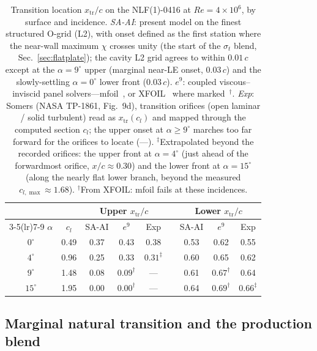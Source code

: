 \documentclass[journal]{new-aiaa}
\begin{document}
\begin{table}[tp]
  \centering
  \small
  \caption{Transition location $x_\mathrm{tr}/c$ on the NLF(1)-0416 at
  $Re\!=\!4\!\times\!10^6$, by surface and incidence. \emph{SA-AI}: present
  model on the finest structured O-grid (L2), with onset defined as the first
  station where the near-wall maximum $\chi$ crosses unity (the start of the
  $\sigma_t$ blend, Sec.~\ref{sec:flatplate}); the cavity
  L2 grid agrees to within $0.01\,c$ except at the $\alpha\!=\!9^\circ$ upper
  (marginal near-LE onset, $0.03\,c$) and the slowly-settling
  $\alpha\!=\!0^\circ$ lower front ($0.03\,c$). \emph{$e^9$}: coupled viscous--inviscid
  panel solvers---mfoil~\cite{fidkowski_mfoil_2022}, or
  XFOIL~\cite{drela_xfoil_1989} where marked~$^\dagger$. \emph{Exp}: Somers
  (NASA TP-1861, Fig.~9d), transition orifices (open laminar / solid turbulent)
  read as $x_\mathrm{tr}(c_l)$ and mapped through the computed section $c_l$; the
  upper onset at $\alpha\!\geq\!9^\circ$ marches too far forward for the orifices
  to locate (---). $^\ddagger$Extrapolated beyond the recorded orifices: the
  upper front at $\alpha\!=\!4^\circ$ (just ahead of the forwardmost orifice,
  $x/c\!\approx\!0.30$) and the lower front at $\alpha\!=\!15^\circ$ (along the
  nearly flat lower branch, beyond the measured $c_{l,\max}\!\approx\!1.68$).
  $^\dagger$From XFOIL: mfoil fails at these incidences.}
  \label{tab:nlftrans}
  \begin{tabular}{cc ccc c ccc}
    \toprule
    & & \multicolumn{3}{c}{Upper $x_\mathrm{tr}/c$} & & \multicolumn{3}{c}{Lower $x_\mathrm{tr}/c$}\\
    \cmidrule(lr){3-5}\cmidrule(lr){7-9}
    $\alpha$ & $c_l$ & SA-AI & $e^9$ & Exp & & SA-AI & $e^9$ & Exp \\
    \midrule
    $0^\circ$  & 0.49 & 0.37 & 0.43 & 0.38 & & 0.53 & 0.62 & 0.55 \\
    $4^\circ$  & 0.96 & 0.25 & 0.33 & $0.31^\ddagger$ & & 0.60 & 0.65 & 0.62 \\
    $9^\circ$  & 1.48 & 0.08 & $0.09^\dagger$ & ---  & & 0.61 & $0.67^\dagger$ & 0.64 \\
    $15^\circ$ & 1.95 & 0.00 & $0.00^\dagger$ & ---  & & 0.64 & $0.69^\dagger$ & $0.66^\ddagger$ \\
    \bottomrule
  \end{tabular}
\end{table}

\subsection{Marginal natural transition and the production blend}\label{sec:blendnlf}
\end{document}
